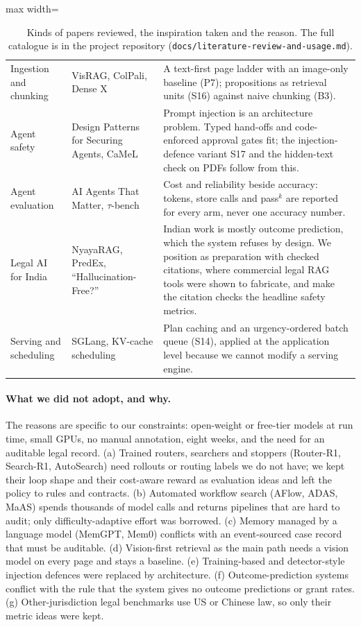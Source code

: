 \begin{table}[!t]
\begin{adjustbox}{max width=\textwidth}
\begin{tabular}{@{}p{3.1cm}p{4.9cm}p{6.6cm}@{}}
Ingestion and chunking & VisRAG, ColPali, Dense X \citep{yu2025visrag,faysse2025colpali,chen2024densex} & A text-first page ladder with an image-only baseline (P7); propositions as retrieval units (S16) against naive chunking (B3). \\
Agent safety & Design Patterns for Securing Agents, CaMeL \citep{beurerkellner2025patterns} & Prompt injection is an architecture problem. Typed hand-offs and code-enforced approval gates fit; the injection-defence variant S17 and the hidden-text check on PDFs follow from this. \\
Agent evaluation & AI Agents That Matter, $\tau$-bench & Cost and reliability beside accuracy: tokens, store calls and pass$^k$ are reported for every arm, never one accuracy number. \\
Legal AI for India & NyayaRAG, PredEx, ``Hallucination-Free?'' \citep{nigam2025nyayarag,nigam2024predex,magesh2025} & Indian work is mostly outcome prediction, which the system refuses by design. We position as preparation with checked citations, where commercial legal RAG tools were shown to fabricate, and make the citation checks the headline safety metrics. \\
Serving and scheduling & SGLang, KV-cache scheduling \citep{zheng2024sglang} & Plan caching and an urgency-ordered batch queue (S14), applied at the application level because we cannot modify a serving engine. \\
\bottomrule
\end{tabular}
\end{adjustbox}
\caption{Kinds of papers reviewed, the inspiration taken and the reason. The full catalogue is in the project repository (\texttt{docs/literature-review-and-usage.md}).}
\label{tab:litkinds}
\end{table}

\paragraph{What we did not adopt, and why.} The reasons are specific to our constraints: open-weight or free-tier models at run time, small GPUs, no manual annotation, eight weeks, and the need for an auditable legal record. (a) Trained routers, searchers and stoppers (Router-R1, Search-R1, AutoSearch) need rollouts or routing labels we do not have; we kept their loop shape and their cost-aware reward as evaluation ideas and left the policy to rules and contracts. (b) Automated workflow search (AFlow, ADAS, MaAS) spends thousands of model calls and returns pipelines that are hard to audit; only difficulty-adaptive effort was borrowed. (c) Memory managed by a language model (MemGPT, Mem0) conflicts with an event-sourced case record that must be auditable. (d) Vision-first retrieval as the main path needs a vision model on every page and stays a baseline. (e) Training-based and detector-style injection defences were replaced by architecture. (f) Outcome-prediction systems conflict with the rule that the system gives no outcome predictions or grant rates. (g) Other-jurisdiction legal benchmarks use US or Chinese law, so only their metric ideas were kept.

